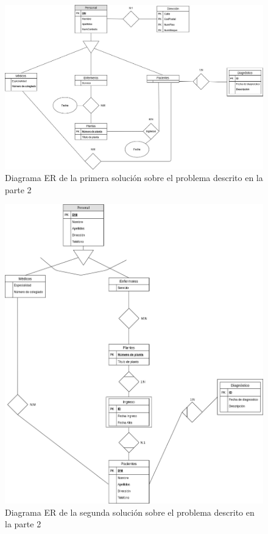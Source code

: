 \documentclass{article}
\begin{document}

\begin{landscape}
\begin{figure}
\centering
\includegraphics[scale=0.5]{images/er_parte2_1.jpg}
\caption{Diagrama ER de la primera solución sobre el problema descrito en la parte 2}
\label{fig:er_parte2_1}
\end{figure}
\end{landscape}

\begin{figure}
\centering
\includegraphics[scale=0.5]{images/er_parte2_2.png}
\caption{Diagrama ER de la segunda solución sobre el problema descrito en la parte 2}
\label{fig:er_parte2_2}
\end{figure}
\end{document}
